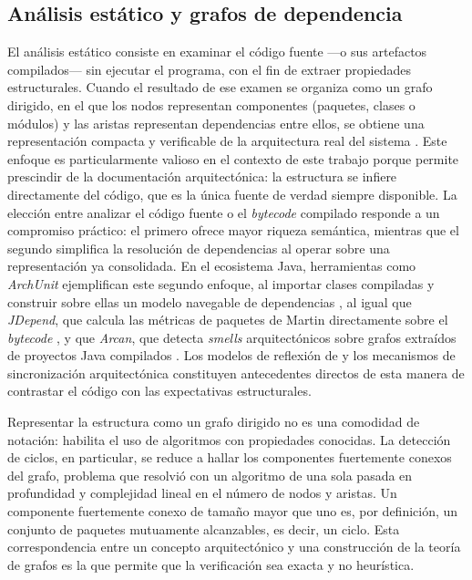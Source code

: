 \subsection{Análisis estático y grafos de dependencia}
El análisis estático consiste en examinar el código fuente —o sus artefactos compilados— sin ejecutar el programa, con el fin de extraer propiedades estructurales. Cuando el resultado de ese examen se organiza como un grafo dirigido, en el que los nodos representan componentes (paquetes, clases o módulos) y las aristas representan dependencias entre ellos, se obtiene una representación compacta y verificable de la arquitectura real del sistema \citep{Manglaras2026}. Este enfoque es particularmente valioso en el contexto de este trabajo porque permite prescindir de la documentación arquitectónica: la estructura se infiere directamente del código, que es la única fuente de verdad siempre disponible. La elección entre analizar el código fuente o el \textit{bytecode} compilado responde a un compromiso práctico: el primero ofrece mayor riqueza semántica, mientras que el segundo simplifica la resolución de dependencias al operar sobre una representación ya consolidada. En el ecosistema Java, herramientas como \textit{ArchUnit} ejemplifican este segundo enfoque, al importar clases compiladas y construir sobre ellas un modelo navegable de dependencias \citep{ArchUnit}, al igual que \textit{JDepend}, que calcula las métricas de paquetes de Martin directamente sobre el \textit{bytecode} \citep{JDepend}, y que \textit{Arcan}, que detecta \textit{smells} arquitectónicos sobre grafos extraídos de proyectos Java compilados \citep{ArcelliFontana2016}. Los modelos de reflexión de \citet{Murphy2001} y los mecanismos de sincronización arquitectónica \citep{ArchSyncJAndres} constituyen antecedentes directos de esta manera de contrastar el código con las expectativas estructurales.

Representar la estructura como un grafo dirigido no es una comodidad de notación: habilita el uso de algoritmos con propiedades conocidas. La detección de ciclos, en particular, se reduce a hallar los componentes fuertemente conexos del grafo, problema que \citet{Tarjan1972} resolvió con un algoritmo de una sola pasada en profundidad y complejidad lineal en el número de nodos y aristas. Un componente fuertemente conexo de tamaño mayor que uno es, por definición, un conjunto de paquetes mutuamente alcanzables, es decir, un ciclo. Esta correspondencia entre un concepto arquitectónico y una construcción de la teoría de grafos es la que permite que la verificación sea exacta y no heurística.

